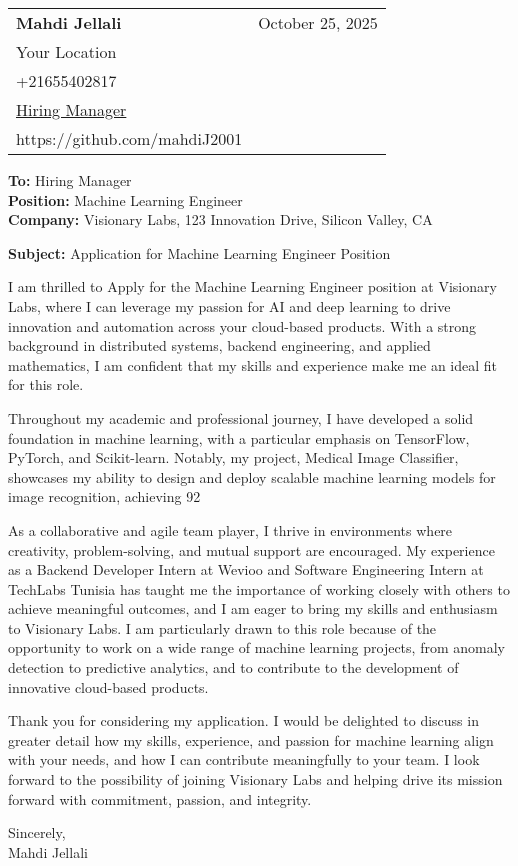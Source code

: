 \documentclass[letterpaper,11pt]{article}
\makeatletter
\newcommand{\letterHeading}[5]{
    \begin{tabular*}{\textwidth}{l@{\extracolsep{\fill}}r}
    \textbf{\Large #1} & #5 \\  %
    #2 & \\
    #3 & \\
    #4 & \\
    \end{tabular*}
    \vspace{15pt}
}
\newcommand{\letterRecipient}[3]{
    \textbf{\large To:} #1 \\
    \textbf{\large Position:} #2 \\
    \textbf{\large Company:} #3 \\
    \vspace{12pt}
}
\newcommand{\letterSubject}[1]{
    \textbf{\large Subject:} #1 \\
    \vspace{15pt}
}
\makeatother
\begin{document}
    \letterHeading
    {Mahdi Jellali}
    {Your Location}
    {+21655402817 \\ \href{mailto:Hiring Manager}{Hiring Manager}}
    {https://github.com/mahdiJ2001}
    {October 25, 2025}

    \letterRecipient
    {Hiring Manager}
    {Machine Learning Engineer}
    {Visionary Labs, 123 Innovation Drive, Silicon Valley, CA}

    \letterSubject{Application for Machine Learning Engineer Position}

I am thrilled to Apply for the Machine Learning Engineer position at Visionary Labs, where I can leverage my passion for AI and deep learning to drive innovation and automation across your cloud-based products. With a strong background in distributed systems, backend engineering, and applied mathematics, I am confident that my skills and experience make me an ideal fit for this role.

    Throughout my academic and professional journey, I have developed a solid foundation in machine learning, with a particular emphasis on TensorFlow, PyTorch, and Scikit-learn. Notably, my project, Medical Image Classifier, showcases my ability to design and deploy scalable machine learning models for image recognition, achieving 92%

    As a collaborative and agile team player, I thrive in environments where creativity, problem-solving, and mutual support are encouraged. My experience as a Backend Developer Intern at Wevioo and Software Engineering Intern at TechLabs Tunisia has taught me the importance of working closely with others to achieve meaningful outcomes, and I am eager to bring my skills and enthusiasm to Visionary Labs. I am particularly drawn to this role because of the opportunity to work on a wide range of machine learning projects, from anomaly detection to predictive analytics, and to contribute to the development of innovative cloud-based products.

    Thank you for considering my application. I would be delighted to discuss in greater detail how my skills, experience, and passion for machine learning align with your needs, and how I can contribute meaningfully to your team. I look forward to the possibility of joining Visionary Labs and helping drive its mission forward with commitment, passion, and integrity.

    Sincerely,\\[12pt]

    Mahdi Jellali
\end{document}
